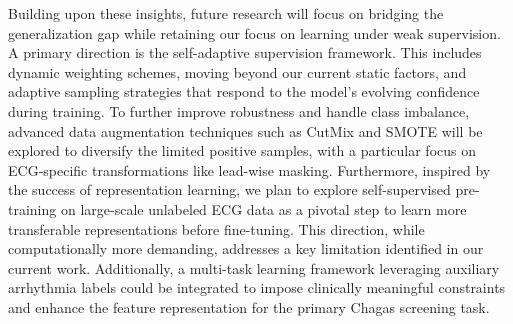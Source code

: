 Building upon these insights, future research will focus on bridging the generalization gap while retaining our focus on learning under weak supervision. A primary direction is the self-adaptive supervision framework. This includes dynamic weighting schemes, moving beyond our current static factors, and adaptive sampling strategies that respond to the model's evolving confidence during training. To further improve robustness and handle class imbalance, advanced data augmentation techniques such as CutMix \cite{yun2019cutmix} and SMOTE \cite{Chawla_2002_SMOTE} will be explored to diversify the limited positive samples, with a particular focus on ECG-specific transformations like lead-wise masking. Furthermore, inspired by the success of representation learning, we plan to explore self-supervised pre-training on large-scale unlabeled ECG data as a pivotal step to learn more transferable representations before fine-tuning. This direction, while computationally more demanding, addresses a key limitation identified in our current work. Additionally, a multi-task learning framework leveraging auxiliary arrhythmia labels could be integrated to impose clinically meaningful constraints and enhance the feature representation for the primary Chagas screening task.
